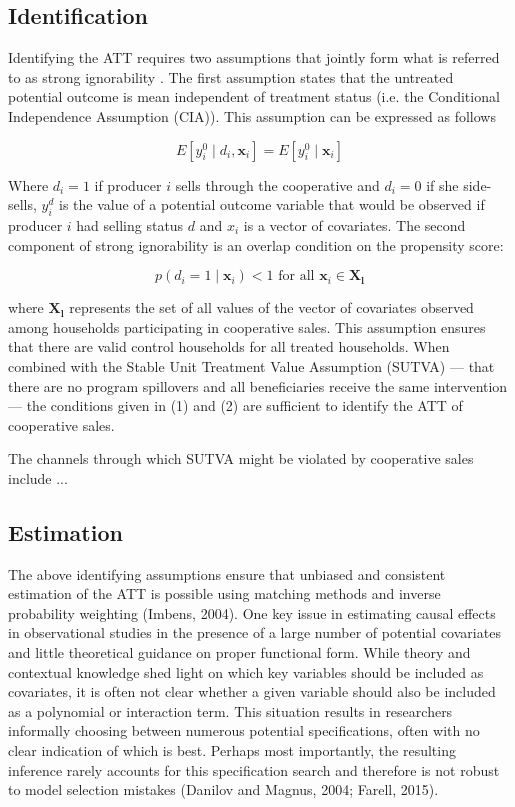 \documentclass[11pt]{article}
\begin{document}
\subsection{Identification}

Identifying the ATT requires two assumptions that jointly form what is referred to as strong ignorability \citep{rosenbaum and Ruben, 1983}. The first assumption states that the untreated potential outcome is mean independent of treatment status (i.e. the Conditional Independence Assumption (CIA)). This assumption can be expressed as follows

\begin{equation}
E\left[y_{i}^{0} \mid d_{i}, \mathbf{x}_{i}\right]=E\left[y_{i}^{0} \mid \mathbf{x}_{i}\right]
\end{equation}

Where $d_i = 1$ if producer $i$ sells through the cooperative and $d_i = 0$ if she side-sells, $y^{d}_{i}$ is the value of a potential outcome variable that would be observed if producer $i$ had selling status $d$ and $x_i$ is a vector of covariates. The second component of strong ignorability is an overlap condition on the propensity score:

\begin{equation}
p\left(d_{i}=1 \mid \mathbf{x}_{i}\right)<1 \text { for all } \mathbf{x}_{i} \in \mathbf{X}_{\mathbf{l}}
\end{equation}

where $\mathbf{X}_{\mathbf{l}}$ represents the set of all values of the vector of covariates observed among households participating in cooperative sales. This assumption ensures that there are valid control households for all treated households. When combined with the Stable Unit Treatment Value Assumption (SUTVA) --- that there are no program spillovers and all beneficiaries receive the same intervention --- the conditions given in (1) and (2) are sufficient to identify the ATT of cooperative sales.

The channels through which SUTVA might be violated by cooperative sales include ...


\subsection{Estimation}

The above identifying assumptions ensure that unbiased and consistent estimation of the ATT is possible using matching methods and inverse probability weighting (Imbens, 2004). One key issue in estimating causal effects in observational studies in the presence of a large number of potential covariates and little theoretical guidance on proper functional form. While theory and contextual knowledge shed light on which key variables should be included as covariates, it is often not clear whether a given variable should also be included as a polynomial or interaction term. This situation results in researchers informally choosing between numerous potential specifications, often with no clear indication of which is best. Perhaps most importantly, the resulting inference rarely accounts for this specification search and therefore is not robust to model selection mistakes (Danilov and Magnus, 2004; Farell, 2015). 
\end{document}
